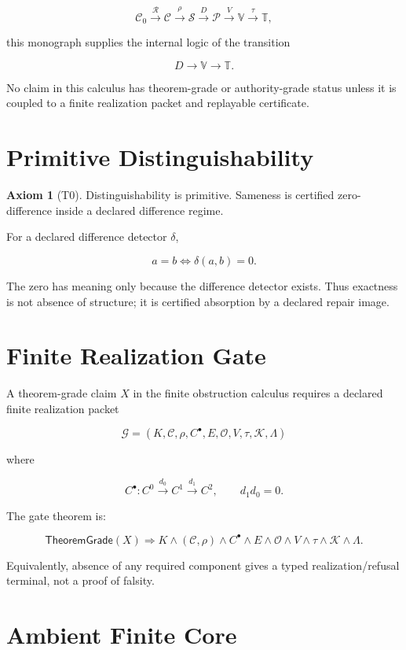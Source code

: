 \documentclass[11pt]{article}
\theoremstyle{definition}
\newtheorem{axiom}[theorem]{Axiom}
\begin{document}
\[
\mathcal C_0
\xrightarrow{\mathcal R}
\mathcal C
\xrightarrow{\rho}
\mathcal S
\xrightarrow{D}
\mathcal P
\xrightarrow{V}
\mathbb V
\xrightarrow{\tau}
\mathbb T,
\]

this monograph supplies the internal logic of the transition

\[
D\to\mathbb V\to\mathbb T.
\]

No claim in this calculus has theorem-grade or authority-grade status unless it is coupled to a finite realization packet and replayable certificate.

\section{Primitive Distinguishability}

\begin{axiom}[T0]
Distinguishability is primitive. Sameness is certified zero-difference inside a declared difference regime.
\end{axiom}

For a declared difference detector \(\delta\),

\[
a=b \iff \delta(a,b)=0.
\]

The zero has meaning only because the difference detector exists. Thus exactness is not absence of structure; it is certified absorption by a declared repair image.

\section{Finite Realization Gate}

A theorem-grade claim \(X\) in the finite obstruction calculus requires a declared finite realization packet

\[
\mathcal G=(K,\mathcal C,\rho,C^\bullet,E,\mathcal O,V,\tau,\mathcal K,\Lambda)
\]

where

\[
C^\bullet:C^0\xrightarrow{d_0}C^1\xrightarrow{d_1}C^2,
\qquad d_1d_0=0.
\]

The gate theorem is:

\[
\boxed{
\mathsf{TheoremGrade}(X)\Rightarrow
K\wedge(\mathcal C,\rho)\wedge C^\bullet\wedge E\wedge\mathcal O\wedge V\wedge\tau\wedge\mathcal K\wedge\Lambda.
}
\]

Equivalently, absence of any required component gives a typed realization/refusal terminal, not a proof of falsity.

\section{Ambient Finite Core}
\end{document}
